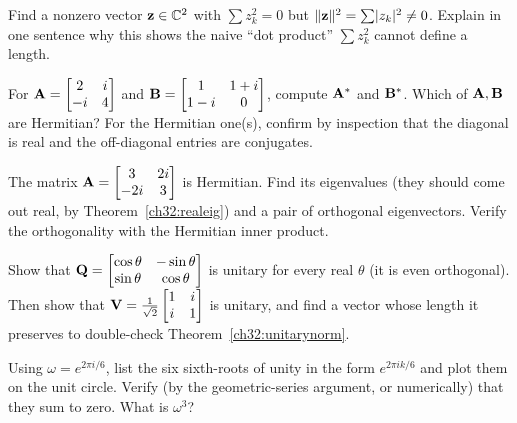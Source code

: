 \begin{exercise}\label{ch32:ex-naivefail}
Find a nonzero vector $\mathbf{z}\in\mathbb{C}^2$ with $\sum z_k^2 = 0$ but
$\lVert\mathbf{z}\rVert^2=\sum\lvert z_k\rvert^2 \ne 0$. Explain in one sentence why this shows the
naive ``dot product'' $\sum z_k^2$ cannot define a length.
\end{exercise}

\begin{exercise}\label{ch32:ex-star}
For $\mathbf{A}=\begin{bmatrix}2 & i\\ -i & 4\end{bmatrix}$ and $\mathbf{B}=\begin{bmatrix}1 & 1+i\\ 1-i & 0\end{bmatrix}$,
compute $\mathbf{A}^{*}$ and $\mathbf{B}^{*}$. Which of $\mathbf{A},\mathbf{B}$ are Hermitian?
For the Hermitian one(s), confirm by inspection that the diagonal is real and the
off-diagonal entries are conjugates.
\end{exercise}

\begin{exercise}\label{ch32:ex-hermeig}
The matrix $\mathbf{A}=\begin{bmatrix}3 & 2i\\ -2i & 3\end{bmatrix}$ is Hermitian. Find its eigenvalues
(they should come out real, by Theorem~\ref{ch32:realeig}) and a pair of orthogonal
eigenvectors. Verify the orthogonality with the Hermitian inner product.
\end{exercise}

\begin{exercise}\label{ch32:ex-unitarycheck}
Show that $\mathbf{Q}=\begin{bmatrix}\cos\theta & -\sin\theta\\ \sin\theta & \cos\theta\end{bmatrix}$ is
unitary for every real $\theta$ (it is even orthogonal). Then show that
$\mathbf{V}=\tfrac1{\sqrt2}\begin{bmatrix}1 & i\\ i & 1\end{bmatrix}$ is unitary, and find a vector whose
length it preserves to double-check Theorem~\ref{ch32:unitarynorm}.
\end{exercise}

\begin{exercise}\label{ch32:ex-rootsum}
Using $\omega=e^{2\pi i/6}$, list the six sixth-roots of unity in the form
$e^{2\pi ik/6}$ and plot them on the unit circle. Verify (by the geometric-series
argument, or numerically) that they sum to zero. What is $\omega^3$?
\end{exercise}

